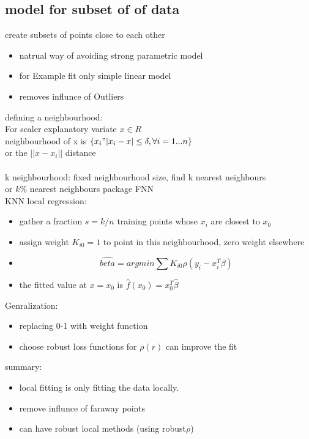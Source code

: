 \documentclass[10pt]{article}
\theoremstyle{break}
\begin{document}
   \subsection{model for subset of of data}
        create subsets of points close to each other 
        \begin{itemize}
            \item natrual way of avoiding strong parametric model 
            \item for Example fit only simple linear model
            \item removes influnce of Outliers
        \end{itemize}
        defining a neighbourhood:\\
        For scaler explanatory variate $x\in R$
        \\neighbourhood of x is $\{x_i"|x_i-x|\leq \delta, \forall i=1...n\}$
        \\or the $||x-x_i||$ distance\\\\
        k neighbourhood: fixed neighbourhood size, find k nearest neighbours
        \\or $k\%$ nearest neighbours
        package FNN
        \\KNN local regression:
        \begin{itemize}
            \item gather a fraction $s=k/n$ training points whose $x_i$ are closest to $x_0$
            \item assign weight $K_{i0}=1$ to point in this neighbourhood, zero weight elsewhere
            \item $$\hat{beta}=argmin\sum K_{i0}\rho(y_i-x^T_i\beta)$$
            \item the fitted value at $x=x_0$ is $\hat{f}(x_0)=x_0^T\hat{\beta}$
        \end{itemize}
        Genralization:\\
        \begin{itemize}
            \item replacing 0-1 with weight function 
            \item choose robust loss functions for $\rho(r)$ can improve the fit 
        \end{itemize}
        summary:
        \begin{itemize}
            \item local fitting is only fitting the data locally.
            \item remove influnce of faraway points 
            \item can have robust local methods (using robust$\rho$)
        \end{itemize}
\end{document}
